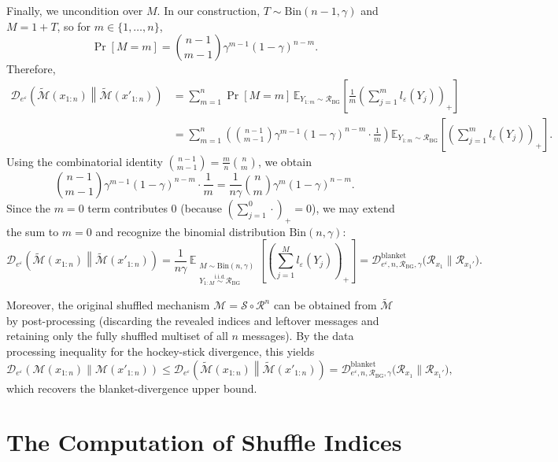 \documentclass{article}
\theoremstyle{plain}
\theoremstyle{definition}
\begin{document}
Finally, we uncondition over $M$. In our construction,
$T\sim \mathrm{Bin}(n-1,\gamma)$ and $M=1+T$, so for $m\in\{1,\dots,n\}$,
\[
\Pr[M=m]=\binom{n-1}{m-1}\gamma^{m-1}(1-\gamma)^{n-m}.
\]
Therefore,
\begin{align*}
\mathcal D_{e^\varepsilon}\!\left(\widetilde{\mathcal M}(x_{1:n})\middle\|\widetilde{\mathcal M}(x'_{1:n})\right)
&=
\sum_{m=1}^n \Pr[M=m]\,
\mathbb E_{Y_{1:m}\sim\mathcal R_{\mathrm{BG}}}
\left[
\frac{1}{m}\left(\sum_{j=1}^m l_\varepsilon(Y_j)\right)_+
\right] \\
&=
\sum_{m=1}^n
\left(\binom{n-1}{m-1}\gamma^{m-1}(1-\gamma)^{n-m}\cdot\frac{1}{m}\right)
\mathbb E_{Y_{1:m}\sim\mathcal R_{\mathrm{BG}}}
\left[
\left(\sum_{j=1}^m l_\varepsilon(Y_j)\right)_+
\right].
\end{align*}
Using the combinatorial identity
$\binom{n-1}{m-1}=\frac{m}{n}\binom{n}{m}$, we obtain
\[
\binom{n-1}{m-1}\gamma^{m-1}(1-\gamma)^{n-m}\cdot\frac{1}{m}
=
\frac{1}{n\gamma}\binom{n}{m}\gamma^{m}(1-\gamma)^{n-m}.
\]
Since the $m=0$ term contributes $0$ (because $(\sum_{j=1}^0\cdot)_+=0$), we
may extend the sum to $m=0$ and recognize the binomial distribution
$\mathrm{Bin}(n,\gamma)$:
\[
\mathcal D_{e^\varepsilon}\!\left(\widetilde{\mathcal M}(x_{1:n})\middle\|\widetilde{\mathcal M}(x'_{1:n})\right)
=
\frac{1}{n\gamma}\,
\mathbb E_{\substack{M\sim \mathrm{Bin}(n,\gamma)\\
Y_{1:M}\stackrel{\mathrm{i.i.d.}}{\sim}\mathcal R_{\mathrm{BG}}}}
\left[
\left(\sum_{j=1}^M l_\varepsilon(Y_j)\right)_+
\right]
=
\mathcal D^{\mathrm{blanket}}_{e^\varepsilon,n,\mathcal R_{\mathrm{BG}},\gamma}
\bigl(\mathcal R_{x_1}\|\mathcal R_{x_1'}\bigr).
\]

Moreover, the original shuffled mechanism $\mathcal M=\mathcal S\circ\mathcal R^n$
can be obtained from $\widetilde{\mathcal M}$ by post-processing (discarding
the revealed indices and leftover messages and retaining only the fully
shuffled multiset of all $n$ messages). By the data processing inequality
for the hockey-stick divergence, this yields
\[
\mathcal D_{e^\varepsilon}\!\left(\mathcal M(x_{1:n})\middle\|\mathcal M(x'_{1:n})\right)
\le
\mathcal D_{e^\varepsilon}\!\left(\widetilde{\mathcal M}(x_{1:n})\middle\|\widetilde{\mathcal M}(x'_{1:n})\right)
=
\mathcal D^{\mathrm{blanket}}_{e^\varepsilon,n,\mathcal R_{\mathrm{BG}},\gamma}
\bigl(\mathcal R_{x_1}\|\mathcal R_{x_1'}\bigr),
\]
which recovers the blanket-divergence upper bound.


\section{The Computation of Shuffle Indices}
\label{app:computation-shuffle-indices}
\end{document}
